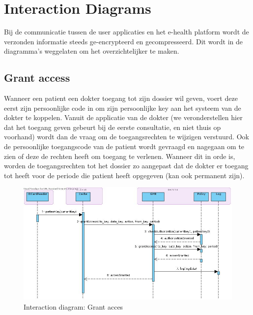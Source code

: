 \documentclass[a4paper,10pt]{article}
\begin{document}
\clearpage
\section{Interaction Diagrams}
\label{interaction:main}
Bij de communicatie tussen de user applicaties en het e-health platform wordt de verzonden informatie steeds ge-encrypteerd en gecompresseerd. Dit wordt in de diagramma's weggelaten om het overzichtelijker te maken. 


\subsection{Grant access}
\label{interaction:grantAccess}
Wanneer een patient een dokter toegang tot zijn dossier wil geven, voert deze eerst zijn persoonlijke code in om zijn persoonlijke key aan het systeem van de dokter te koppelen. Vanuit de applicatie van de dokter (we veronderstellen hier dat het toegang geven gebeurt bij de eerste consultatie, en niet thuis op voorhand) wordt dan de vraag om de toegangsrechten te wijzigen verstuurd. Ook de persoonlijke toegangscode van de patient wordt gevraagd en nagegaan om te zien of deze de rechten heeft om toegang te verlenen. Wanneer dit in orde is, worden de toegangsrechten tot het dossier zo aangepast dat de dokter er toegang tot heeft voor de periode die patient heeft opgegeven (kan ook permanent zijn). 

\begin{figure}[!h]
  \includegraphics[width=\textwidth]{../images/grantAccess.jpg}
  \caption{Interaction diagram: Grant acces}
\end{figure}
\end{document}
